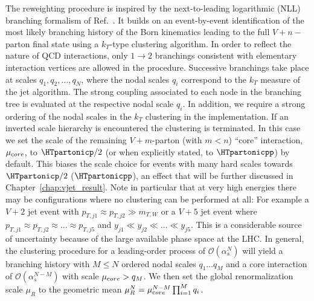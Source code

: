 The \MINLO{} reweighting procedure is inspired
by the next-to-leading logarithmic (NLL) branching formalism of Ref.~\cite{Catani1993kt}. It builds on an event-by-event identification
of the most likely branching history of the Born kinematics leading to the full $V+n-$parton final state using
a $k_T$-type clustering algorithm. In order to reflect the nature of QCD interactions, only $1\rightarrow 2$ branchings
consistent with elementary interaction vertices are allowed in the \MINLO{} procedure. Successive branchings take place at scales $q_1 , q_2,\ldots , q_N$, where the nodal scales $q_i$ correspond to the $k_T$ measure of the jet algorithm. The strong coupling associated to each node
in the branching tree is evaluated at the respective nodal scale $q_i$. In addition, we require a strong ordering of the nodal scales in the $k_T$ clustering in the \MINLOp{} implementation. If an inverted scale hierarchy is encountered the clustering is terminated. In this case we set the scale of the remaining $V+m$-parton (with $m<n$) ``core'' interaction,
$\mu_{\textrm core}$, to $\HTpartonicp/2$ (or when explicitly stated, to $\HTpartonicpp$) by default. This biases the scale choice for events with many hard scales towards $\HTpartonicp/2$
($\HTpartonicpp$), an effect that will be further discussed in Chapter~\ref{chap:vjet_result}. Note in particular that at very high energies there may be configurations where no clustering
can be performed at all: For example a $V+2$ jet event with
$p_{T,j1}\approx p_{T,j2}\gg m_{T,W}$ or a $V+5$ jet event where
$p_{T,j1}\approx p_{T,j2}\approx\ldots\approx p_{T,j5}$
and $y_{j1}\ll y_{j2}\ll\ldots\ll y_{j5}$. This is a considerable source of uncertainty because of the large available
phase space at the LHC. In general, the clustering procedure for a leading-order process of
$\mathcal{O}(\alpha_s^N)$ will yield a branching history with $M\le N$
ordered nodal scales $q_1\ldots q_M$ and a core interaction of
$\mathcal{O}(\alpha_s^{N-M})$ with scale $\mu_{\textrm core}>q_M$.
We then set the global renormalization scale $\mu_R$ to the geometric mean
$\mu_R^{N}=\mu_{\textrm core}^{N-M}\prod_{i=1}^{M}q_i$.


